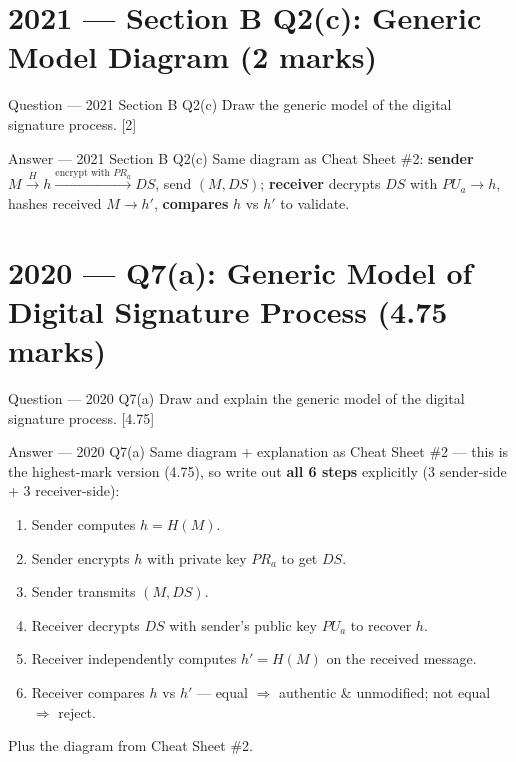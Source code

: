 \documentclass[12pt,a4paper]{article}
\begin{document}
\newpage
\section{2021 --- Section B Q2(c): Generic Model Diagram (2 marks)}

\begin{qbox}{Question --- 2021 Section B Q2(c)}
Draw the generic model of the digital signature process. \hfill [2]
\end{qbox}

\begin{solbox}{Answer --- 2021 Section B Q2(c)}
Same diagram as Cheat Sheet \#2: \textbf{sender} $M \xrightarrow{H} h \xrightarrow{\text{encrypt with } PR_a} DS$, send $(M,DS)$; \textbf{receiver} decrypts $DS$ with $PU_a \to h$, hashes received $M \to h'$, \textbf{compares} $h$ vs $h'$ to validate.
\end{solbox}

\newpage
\section{2020 --- Q7(a): Generic Model of Digital Signature Process (4.75 marks)}

\begin{qbox}{Question --- 2020 Q7(a)}
Draw and explain the generic model of the digital signature process. \hfill [4.75]
\end{qbox}

\begin{solbox}{Answer --- 2020 Q7(a)}
Same diagram + explanation as Cheat Sheet \#2 --- this is the highest-mark version (4.75), so write out \textbf{all 6 steps} explicitly (3 sender-side + 3 receiver-side):
\begin{enumerate}[noitemsep]
  \item Sender computes $h = H(M)$.
  \item Sender encrypts $h$ with private key $PR_a$ to get $DS$.
  \item Sender transmits $(M, DS)$.
  \item Receiver decrypts $DS$ with sender's public key $PU_a$ to recover $h$.
  \item Receiver independently computes $h' = H(M)$ on the received message.
  \item Receiver compares $h$ vs $h'$ --- equal $\Rightarrow$ authentic \& unmodified; not equal $\Rightarrow$ reject.
\end{enumerate}
Plus the diagram from Cheat Sheet \#2.
\end{solbox}
\end{document}
